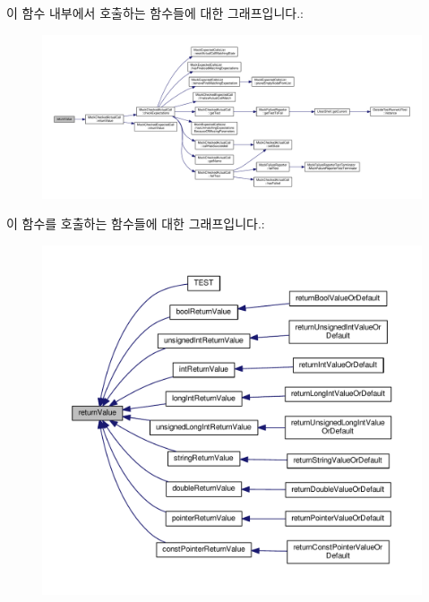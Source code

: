 이 함수 내부에서 호출하는 함수들에 대한 그래프입니다.\+:
\nopagebreak
\begin{figure}[H]
\begin{center}
\leavevmode
\includegraphics[width=350pt]{class_mock_support_a1afc0a670963abd85b5d7f7c8af305a4_cgraph}
\end{center}
\end{figure}




이 함수를 호출하는 함수들에 대한 그래프입니다.\+:
\nopagebreak
\begin{figure}[H]
\begin{center}
\leavevmode
\includegraphics[width=350pt]{class_mock_support_a1afc0a670963abd85b5d7f7c8af305a4_icgraph}
\end{center}
\end{figure}


